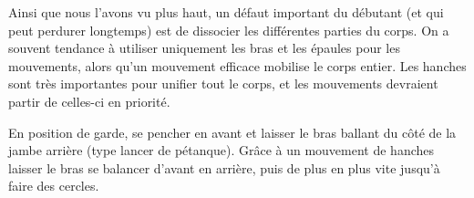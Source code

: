 Ainsi que nous l'avons vu plus haut, un défaut important du débutant (et qui peut perdurer longtemps) est de dissocier les différentes parties du corps.
On a souvent tendance à utiliser uniquement les bras et les épaules pour les mouvements, alors qu'un mouvement efficace mobilise le corps entier.
Les hanches sont très importantes pour unifier tout le corps, et les mouvements devraient partir de celles-ci en priorité.


\begin{exercice}
En position de garde, se pencher en avant et laisser le bras ballant du côté de la jambe arrière (type lancer de pétanque).
Grâce à un mouvement de hanches laisser le bras se balancer d'avant en arrière, puis de plus en plus vite jusqu'à faire des cercles.

\end{exercice}


